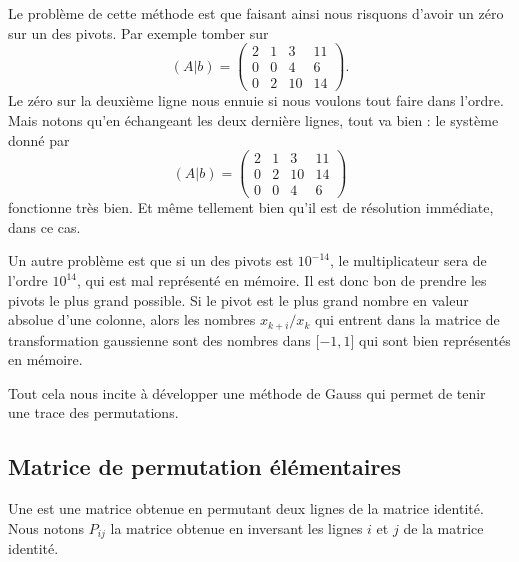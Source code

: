 Le problème de cette méthode est que faisant ainsi nous risquons d'avoir un zéro sur un des pivots. Par exemple tomber sur
\begin{equation}
    (A|b)=\begin{pmatrix}
         2   &   1    &   3    &   11    \\
         0   &   0    &   4    &   6    \\ 
         0   &   2    &   10    &   14
     \end{pmatrix}.
\end{equation}
Le zéro sur la deuxième ligne nous ennuie si nous voulons tout faire dans l'ordre. Mais notons qu'en échangeant les deux dernière lignes, tout va bien : le système donné par
\begin{equation}
    (A|b)=\begin{pmatrix}
         2   &   1    &   3    &   11    \\
         0   &   2    &   10    &   14\\
         0   &   0    &   4    &   6   
     \end{pmatrix}
\end{equation}
fonctionne très bien. Et même tellement bien qu'il est de résolution immédiate, dans ce cas.

Un autre problème est que si un des pivots est \( 10^{-14}\), le multiplicateur sera de l'ordre \( 10^{14}\), qui est mal représenté en mémoire. Il est donc bon de prendre les pivots le plus grand possible. Si le pivot est le plus grand nombre en valeur absolue d'une colonne, alors les nombres \( x_{k+i}/x_k\) qui entrent dans la matrice de transformation gaussienne sont des nombres dans \( \mathopen[ -1 , 1 \mathclose]\) qui sont bien représentés en mémoire.

Tout cela nous incite à développer une méthode de Gauss qui permet de tenir une trace des permutations.

\subsection{Matrice de permutation élémentaires}

\begin{definition}
    Une  est une matrice obtenue en permutant deux lignes de la matrice identité. Nous notons \( P_{ij}\) la matrice obtenue en inversant les lignes \( i\) et \( j\) de la matrice identité.
\end{definition}

